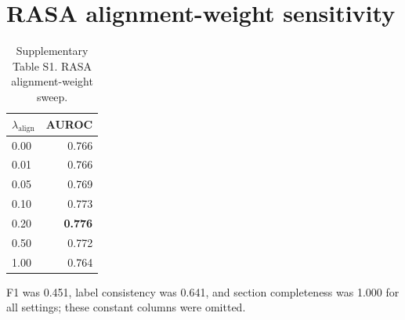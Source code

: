 \documentclass[11pt,a4paper]{article}
\begin{document}
\section*{RASA alignment-weight sensitivity}
\begin{table}[!htbp]
  \centering
  \caption{Supplementary Table S1. RASA alignment-weight sweep.}
  \label{tab:s1_rasa_lambda_align_sweep}
  \small
  \begin{threeparttable}
  \begin{tabular}{lr}
    \toprule
    \textbf{$\lambda_{\mathrm{align}}$} & \textbf{AUROC} \\
    \midrule
    0.00 & 0.766 \\
    0.01 & 0.766 \\
    0.05 & 0.769 \\
    0.10 & 0.773 \\
    0.20 & \textbf{0.776} \\
    0.50 & 0.772 \\
    1.00 & 0.764 \\
    \bottomrule
  \end{tabular}
  \begin{tablenotes}[flushleft]
    \footnotesize
    \item F1 was 0.451, label consistency was 0.641, and section completeness was 1.000 for all settings; these constant columns were omitted.
  \end{tablenotes}
  \end{threeparttable}
\end{table}
\end{document}
